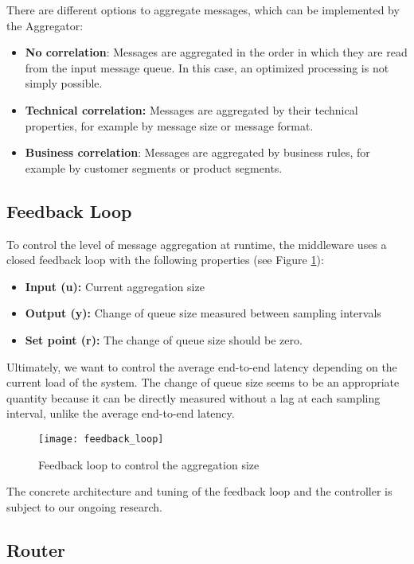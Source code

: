 There are different options to aggregate messages, which can be implemented by the Aggregator:

\begin{itemize}
	\item \textbf{No correlation}: Messages are aggregated in the order in which they are read from the input message queue. In this case, an optimized processing is not simply possible.
	\item \textbf{Technical correlation:} Messages are aggregated by their technical properties, for example by message size or message format.
	\item \textbf{Business correlation}: Messages are aggregated by business rules, for example by customer segments or product segments.
\end{itemize}

\subsection{Feedback Loop}

To control the level of message aggregation at runtime, the middleware uses a closed feedback loop with the following properties (see Figure \ref{fig:feedback_loop}):

\begin{itemize}
	\item \textbf{Input (u):} Current aggregation size
	\item \textbf{Output (y):} Change of queue size measured between sampling intervals
	\item \textbf{Set point (r):} The change of queue size should be zero.
\end{itemize}

Ultimately, we want to control the average end-to-end latency depending on the current load of the system. The change of queue size seems to be an appropriate quantity because it can be directly measured without a lag at each sampling interval, unlike the average end-to-end latency.

\begin{figure}[htbp]
	\centering
	\texttt{[image: feedback\_loop]}
	\caption{Feedback loop to control the aggregation size}
	\label{fig:feedback_loop}
\end{figure}
The concrete architecture and tuning of the feedback loop and the controller is subject to our ongoing research.
\subsection{Router}

